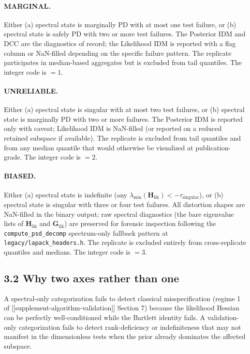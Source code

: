 \documentclass[11pt]{article}
\begin{document}
\paragraph{MARGINAL.} Either (a) spectral state is marginally PD with
at most one test failure, or (b) spectral state is safely PD with two
or more test failures. The Posterior IDM and DCC are the diagnostics
of record; the Likelihood IDM is reported with a flag column or
NaN-filled depending on the specific failure pattern. The replicate
participates in median-based aggregates but is excluded from tail
quantiles. The integer code is $= 1$.

\paragraph{UNRELIABLE.} Either (a) spectral state is singular with at
most two test failures, or (b) spectral state is marginally PD with
two or more failures. The Posterior IDM is reported only with caveat;
Likelihood IDM is NaN-filled (or reported on a reduced retained
subspace if available). The replicate is excluded from tail quantiles
and from any median quantile that would otherwise be visualized at
publication-grade.
The integer code is $= 2$.

\paragraph{BIASED.} Either (a) spectral state is indefinite (any
$\lambda_{\min}(\mathbf H_{\mathrm{lik}}) < -\tau_{\mathrm{singular}}$),
or (b) spectral state is singular with three or four test failures.
All distortion shapes are NaN-filled in the binary output; raw
spectral diagnostics (the bare eigenvalue lists of
$\mathbf H_{\mathrm{lik}}$ and $\mathbf G_{\mathrm{lik}}$) are
preserved for forensic inspection following the
\texttt{compute\_psd\_decomp} spectrum-only fallback pattern at
\texttt{legacy/lapack\_headers.h}. The replicate is excluded entirely
from cross-replicate quantiles and medians. The integer code is $= 3$.

\subsection*{3.2 Why two axes rather than one}

A spectral-only categorization fails to detect classical
misspecification (regime 1 of [[supplement-algorithm-validation]]
Section 7) because the likelihood Hessian can be perfectly
well-conditioned while the Bartlett identity fails. A
validation-only categorization fails to detect rank-deficiency or
indefiniteness that may not manifest in the dimensionless tests when
the prior already dominates the affected subspace.
\end{document}
